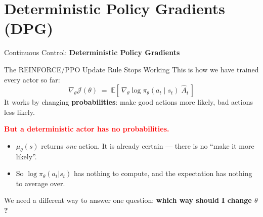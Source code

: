 %

\section{Deterministic Policy Gradients (DPG)}
\begin{frame}{}
    \LARGE Continuous Control: \textbf{Deterministic Policy Gradients}
\end{frame}

\begin{frame}{The REINFORCE/PPO Update Rule Stops Working}
\vspace{0.6em}
This is how we have trained every actor so far:
\[
\nabla_\theta \mathcal{J}(\theta) \;=\; \mathbb{E}\!\left[\, \nabla_\theta \log \pi_\theta(a_t \mid s_t)\; \hat{A}_t \,\right]
\]
It works by changing \textbf{probabilities}: make good actions more likely, bad actions less likely.
\pause
\vspace{1.2em}

\textcolor{red}{\textbf{But a deterministic actor has no probabilities.}}
\vspace{0.5em}
\begin{itemize}
    \setlength{\itemsep}{0.45em}
    \item $\mu_\theta(s)$ returns \emph{one} action. It is already certain --- there is no ``make it more likely''.
    \item So $\log \pi_\theta(a_t|s_t)$ has nothing to compute, and the expectation has nothing to average over.
\end{itemize}
\vspace{0.8em}
\centering
We need a different way to answer one question: \textbf{which way should I change $\theta$?}
\end{frame}

